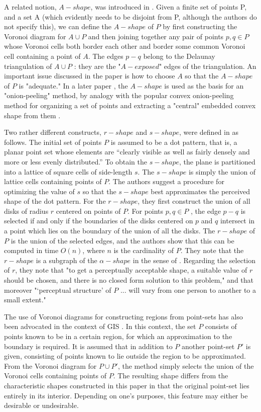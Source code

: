 \documentclass[12pt,a4paper]{article}
\begin{document}
A related notion, $A-shape$, was introduced in \cite{Melkemi:7693802}. Given a finite set of points P, and a set A (which evidently needs to be disjoint from P, although the authors do not specify this), we can define the $A-shape$ of $P$ by first constructing the Voronoi diagram for $A \cup P$ and then joining together any pair of points $p, q \in P$ whose Voronoi cells both border each other and border some common Voronoi cell containing a point of $A$. The edges $p-q$ belong to the Delaunay triangulation of $A \cup P$ : they are the "$A-exposed$" edges of the triangulation. An important
issue discussed in the paper is how to choose $A$ so that the $A-shape$ of $P$ is "adequate." In a later paper \cite{fadili:hal-01123869}, the $A-shape$ is used as the basis for an "onion-peeling" method, by analogy with the popular convex onion-peeling method for organizing a set of points and extracting a "central" embedded convex shape from them \cite{Chazelle1057060}.


Two rather different constructs, $r-shape$ and $s-shape$, were defined in \cite{Chaudhuri:1997:NAC:269777.269779} as follows. The initial set of points $P$ is assumed to be a dot pattern, that is, a planar point set whose elements are “clearly visible as well as fairly densely and more or less evenly distributed.” To obtain the $s-shape$, the plane is partitioned into a lattice of square cells of side-length $s$. The $s-shape$ is simply the union of lattice cells containing points of $P$. The authors suggest a procedure for optimizing the value of $s$ so that the $s-shape$ best approximates the perceived shape of the dot pattern. For the $r-shape$, they first construct the union of all disks of radius $r$ centered on points of $P$. For points $p, q \in P$ , the edge $p-q$ is selected if and only if the boundaries of the disks centered on $p$ and $q$ intersect in a point which lies on the boundary of the union of all the disks. The $r-shape$ of $P$ is the union of the selected edges, and the authors show that this can be computed in time $O(n)$, where $n$ is the cardinality of $P$. They note that the $r-shape$ is a subgraph of the $\alpha-shape$ in the sense of \cite{Edelsbrunner:2006:SSP:2263365.2270180}. Regarding the selection of $r$, they note that "to get a perceptually acceptable shape, a suitable value of $r$ should be chosen, and there is no closed form solution to this problem," and that moreover "‘perceptual structure’ of $P$ ... will vary from one person to another to a small extent."

The use of Voronoi diagrams for constructing regions from point-sets has also been advocated in the context of GIS \cite{Harith01}. In this context, the set $P$ consists of points known to be in a certain region, for which an approximation to the boundary is required. It is assumed that in addition to $P$ another point-set $P'$ is given, consisting of points known to lie outside the region to be approximated. From the Voronoi diagram for $P \cup P'$, the method simply selects the union of the Voronoi cells containing points of $P$. The resulting shape differs from the characteristic shapes constructed in this paper in that the original point-set lies entirely in its interior. Depending on one’s purposes,
this feature may either be desirable or undesirable. 
\end{document}
